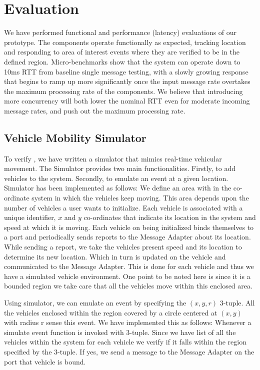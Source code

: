 \section{Evaluation}

We have performed functional and performance (latency) evaluations of
our \name{} prototype.  The components operate functionally as
expected, tracking location and responding to area of interest events
where they are verified to be in the defined region. Micro-benchmarks
show that the system can operate down to 10ms RTT from baseline single
message testing, with a slowly growing response that begins to ramp up
more significantly once the input message rate overtakes the maximum
processing rate of the components.  We believe that introducing more
concurrency will both lower the nominal RTT even for moderate incoming
message rates, and push out the maximum processing rate.

\subsection{Vehicle Mobility Simulator}

To verify \name, we have written a simulator that mimics real-time
vehicular movement. The Simulator provides two main
functionalities. Firstly, to add vehicles to the system. Secondly, to
emulate an event at a given location. \name{} Simulator has been
implemented as follows: We define an area with in the co-ordinate
system in which the vehicles keep moving. This area depends upon the
number of vehicles a user wants to initialize. Each vehicle is
associated with a unique identifier, $x$ and $y$ co-ordinates that
indicate its location in the system and speed at which it is
moving. Each vehicle on being initialized binds themselves to a port
and periodically sends reports to the Message Adapter about its
location. While sending a report, we take the vehicles present speed
and its location to determine its new location.  Which in turn is
updated on the vehicle and communicated to the Message Adapter. This
is done for each vehicle and thus we have a simulated vehicle
environment. One point to be noted here is since it is a bounded
region we take care that all the vehicles move within this enclosed
area.

Using simulator, we can emulate an event by specifying the $(x,y,r)$
3-tuple. All the vehicles enclosed within the region covered by a
circle centered at $(x,y)$ with radius r sense this event. We have
implemented this as follows: Whenever a simulate event function is
invoked with 3-tuple. Since we have list of all the vehicles within
the system for each vehicle we verify if it falls within the region
specified by the 3-tuple. If yes, we send a message to the Message
Adapter on the port that vehicle is bound.


